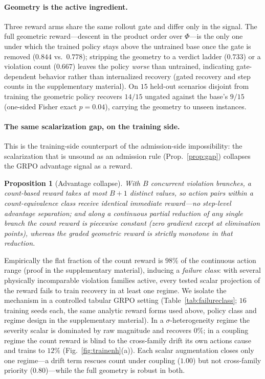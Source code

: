 \documentclass[letterpaper]{article} %
\theoremstyle{plain}
\newtheorem{proposition}{Proposition}
\begin{document}
\paragraph{Geometry is the active ingredient.}
Three reward arms share the same rollout gate and differ only in the signal. The full geometric reward---descent in the product order over $\Phi$---is the only one under which the trained policy stays above the untrained base once the gate is removed ($\mathbf{0.844}$ vs.\ $0.778$); stripping the geometry to a verdict ladder ($0.733$) or a violation count ($0.667$) leaves the policy \emph{worse} than untrained, indicating gate-dependent behavior rather than internalized recovery (gated recovery and step counts in the supplementary material). On $15$ held-out scenarios disjoint from training the geometric policy recovers $14/15$ ungated against the base's $9/15$ (one-sided Fisher exact $p{=}0.04$), carrying the geometry to unseen instances.

\paragraph{The same scalarization gap, on the training side.}
This is the training-side counterpart of the admission-side impossibility: the scalarization that is unsound as an admission rule (Prop.~\ref{prop:gap}) collapses the GRPO advantage signal as a reward.
\begin{proposition}[Advantage collapse]
\label{prop:collapse}
With $B$ concurrent violation branches, a count-based reward takes at most $B{+}1$ distinct values, so action pairs within a count-equivalence class receive identical immediate reward---no step-level advantage separation; and along a continuous partial reduction of any single branch the count reward is piecewise constant (zero gradient except at elimination points), whereas the graded geometric reward is strictly monotone in that reduction.
\end{proposition}

\noindent Empirically the flat fraction of the count reward is $98\%$ of the continuous action range (proof in the supplementary material), inducing a \emph{failure class}: with several physically incomparable violation families active, every tested scalar projection of the reward fails to train recovery in at least one regime. We isolate the mechanism in a controlled tabular GRPO setting (Table~\ref{tab:failureclass}; $16$ training seeds each, the same analytic reward forms used above, policy class and regime design in the supplementary material). In a $\sigma$-heterogeneity regime the severity scalar is dominated by raw magnitude and recovers $0\%$; in a coupling regime the count reward is blind to the cross-family drift its own actions cause and trains to $12\%$ (Fig.~\ref{fig:trainenh}(a)). Each scalar augmentation closes only one regime---a drift term rescues count under coupling ($1.00$) but not cross-family priority ($0.80$)---while the full geometry is robust in both.
\end{document}
